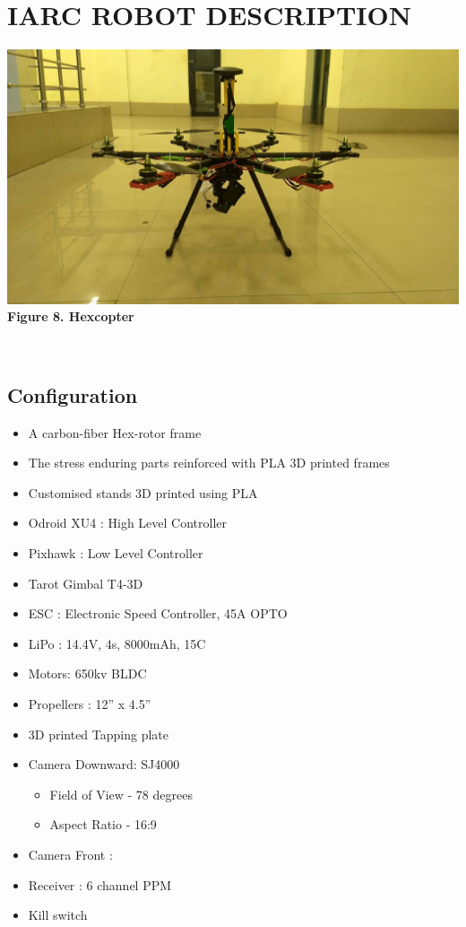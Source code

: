 \documentclass[12pt]{article}
\begin{document}
\section{IARC ROBOT DESCRIPTION}
\begin{center}\includegraphics[scale=0.15]{hex} \\
\textbf{Figure 8. Hexcopter}\end{center}\\
\subsection{Configuration}
\begin{itemize}
	\item A carbon-fiber Hex-rotor frame
	\item The stress enduring parts reinforced with PLA 3D printed frames
	\item Customised stands 3D printed using PLA
    \item Odroid XU4 : High Level Controller
    \item Pixhawk : Low Level Controller
    \item Tarot Gimbal T4-3D
    \item ESC     : Electronic Speed Controller, 45A OPTO
    \item LiPo : 14.4V, 4s, 8000mAh, 15C
    \item Motors: 650kv BLDC
    \item Propellers : 12” x 4.5”
    \item 3D printed Tapping plate
    \item Camera Downward: SJ4000
    \begin{itemize}
    	\item Field of View - 78 degrees
    	\item Aspect Ratio - 16:9
    \end{itemize}
    \item Camera Front : 
    \item Receiver : 6 channel PPM
    \item Kill switch 
\end{itemize}
\end{document}
